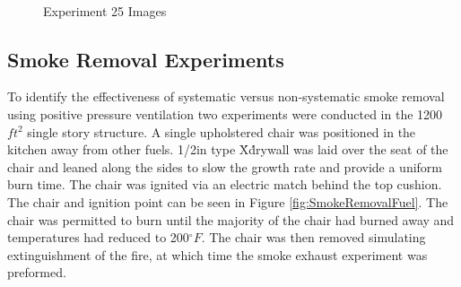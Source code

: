 \documentclass{article}
\begin{document}
\clearpage

\begin{figure}[H]
	\ContinuedFloat 
	\centering 
	 \ 
	\caption{Experiment 25 Images}
	\label{fig:Experiment25ImagesCont3} 
\end{figure}

\subsection{Smoke Removal Experiments}

To identify the effectiveness of systematic versus non-systematic smoke removal using positive pressure ventilation two experiments were conducted in the 1200 $ft^2$ single story structure. A single upholstered chair was positioned in the kitchen away from other fuels. 1/2in type \'X\' drywall was laid over the seat of the chair and leaned along the sides to slow the growth rate and provide a uniform burn time. The chair was ignited via an electric match behind the top cushion. The chair and ignition point can be seen in Figure \ref{fig:SmokeRemovalFuel}. The chair was permitted to burn until the majority of the chair had burned away and temperatures had reduced to 200$^{\circ}F$. The chair was then removed simulating extinguishment of the fire, at which time the smoke exhaust experiment was preformed. 
\end{document}

